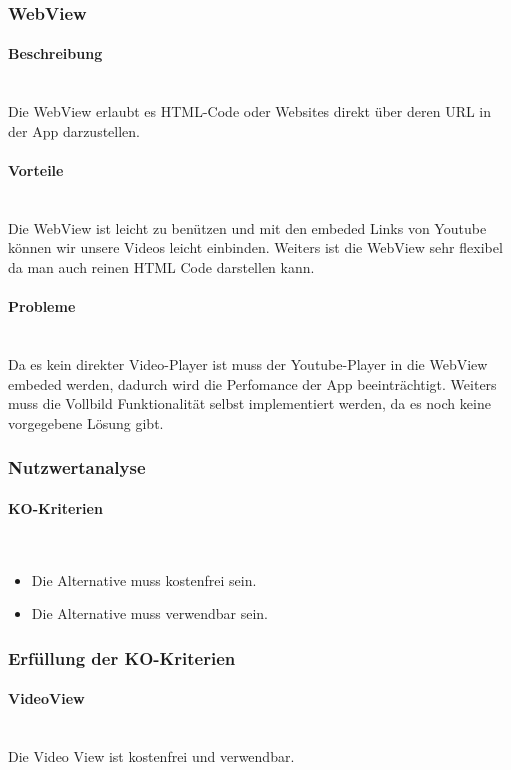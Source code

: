 \documentclass[FIPLY_base.tex]{subfiles}
\begin{document}
\subsubsection{WebView}
\paragraph{Beschreibung}\ \\
Die WebView erlaubt es HTML-Code oder Websites direkt über deren URL in der App darzustellen.
\paragraph{Vorteile}\ \\
Die WebView ist leicht zu benützen und mit den embeded Links von Youtube können wir unsere Videos leicht einbinden. Weiters ist die WebView sehr flexibel da man auch reinen HTML Code darstellen kann.
\paragraph{Probleme}\ \\
Da es kein direkter Video-Player ist muss der Youtube-Player in die WebView embeded werden, dadurch wird die Perfomance der App beeinträchtigt. Weiters muss die Vollbild Funktionalität selbst implementiert werden, da es noch keine vorgegebene Lösung gibt.


\subsubsection{Nutzwertanalyse}
\paragraph{KO-Kriterien}\ \\
\begin{itemize}
\item Die Alternative muss kostenfrei sein.
\item Die Alternative muss verwendbar sein.
\end{itemize}
\subsubsection{Erfüllung der KO-Kriterien}
\paragraph{VideoView}\ \\
Die Video View ist kostenfrei und verwendbar.
\end{document}
